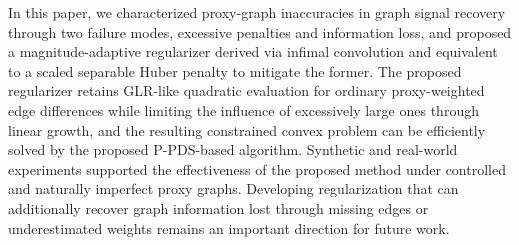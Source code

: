In this paper, we characterized proxy-graph inaccuracies in graph signal recovery through two failure modes, excessive penalties and information loss, and proposed a magnitude-adaptive regularizer derived via infimal convolution and equivalent to a scaled separable Huber penalty to mitigate the former.
The proposed regularizer retains GLR-like quadratic evaluation for ordinary proxy-weighted edge differences while limiting the influence of excessively large ones through linear growth, and the resulting constrained convex problem can be efficiently solved by the proposed P-PDS-based algorithm.
Synthetic and real-world experiments supported the effectiveness of the proposed method under controlled and naturally imperfect proxy graphs.
Developing regularization that can additionally recover graph information lost through missing edges or underestimated weights remains an important direction for future work.